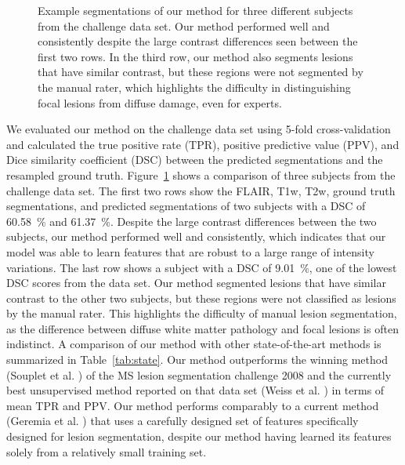 \begin{figure}[tb]

\caption{Example segmentations of our method for three different subjects from
the challenge data set. Our method performed well and consistently despite the
large contrast differences seen between the first two rows. In the third row,
our method also segments lesions that have similar contrast, but these regions
were not segmented by the manual rater, which highlights the difficulty in
distinguishing focal lesions from diffuse damage, even for experts.}

\label{fig:segmentation}
\end{figure}

We evaluated our method on the challenge data set using 5-fold
cross-valida\-tion and calculated the true positive rate (TPR), positive
predictive value (PPV), and Dice similarity coefficient (DSC) between the
predicted segmentations and the resampled ground truth.
Figure~\ref{fig:segmentation} shows a comparison of three subjects from the
challenge data set. The first two rows show the FLAIR, T1w, T2w, ground truth
segmentations, and predicted segmentations of two subjects with a DSC of
\SI{60.58}{\percent} and \SI{61.37}{\percent}. Despite the large contrast
differences between the two subjects, our method performed well and
consistently, which indicates that our model was able to learn features that are
robust to a large range of intensity variations. The last row shows a subject
with a DSC of \SI{9.01}{\percent}, one of the lowest DSC scores from the data
set. Our method segmented lesions that have similar contrast to the other two
subjects, but these regions were not classified as lesions by the manual rater.
This highlights the difficulty of manual lesion segmentation, as the difference
between diffuse white matter pathology and focal lesions is often indistinct. A
comparison of our method with other state-of-the-art methods is summarized in
Table~\ref{tab:state}. Our method outperforms the winning method (Souplet et al.
\cite{souplet2008}) of the MS lesion segmentation challenge 2008 and the
currently best unsupervised method reported on that data set (Weiss et al.
\cite{weiss2013}) in terms of mean TPR and PPV. Our method performs comparably
to a current method (Geremia et al. \cite{geremia2010}) that uses a carefully
designed set of features specifically designed for lesion segmentation, despite
our method having learned its features solely from a relatively small training
set.

